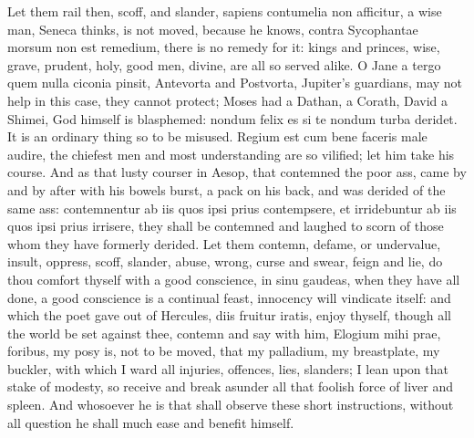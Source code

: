 {Let them rail then, scoff, and slander, sapiens contumelia non
afficitur, a wise man, Seneca thinks, is not moved, because he knows,
contra Sycophantae morsum non est remedium, there is no remedy for it:
kings and princes, wise, grave, prudent, holy, good men, divine, are
all so served alike. O Jane a tergo quem nulla ciconia pinsit,
Antevorta and Postvorta, Jupiter's guardians, may not help in this
case, they cannot protect; Moses had a Dathan, a Corath, David a
Shimei, God himself is blasphemed: nondum felix es si te nondum turba
deridet. It is an ordinary thing so to be misused. Regium est cum
bene faceris male audire, the chiefest men and most understanding are
so vilified; let him take his course. And as that lusty courser
in Aesop, that contemned the poor ass, came by and by after with his
bowels burst, a pack on his back, and was derided of the same ass:
contemnentur ab iis quos ipsi prius contempsere, et irridebuntur ab iis
quos ipsi prius irrisere, they shall be contemned and laughed to scorn
of those whom they have formerly derided. Let them contemn, defame, or
undervalue, insult, oppress, scoff, slander, abuse, wrong, curse and
swear, feign and lie, do thou comfort thyself with a good conscience,
in sinu gaudeas, when they have all done, a good conscience is a
continual feast, innocency will vindicate itself: and which the poet
gave out of Hercules, diis fruitur iratis, enjoy thyself, though all
the world be set against thee, contemn and say with him, Elogium mihi
prae, foribus, my posy is, not to be moved, that my palladium, my
breastplate, my buckler, with which I ward all injuries, offences,
lies, slanders; I lean upon that stake of modesty, so receive and break
asunder all that foolish force of liver and spleen. And whosoever he is
that shall observe these short instructions, without all question he
shall much ease and benefit himself.

}
